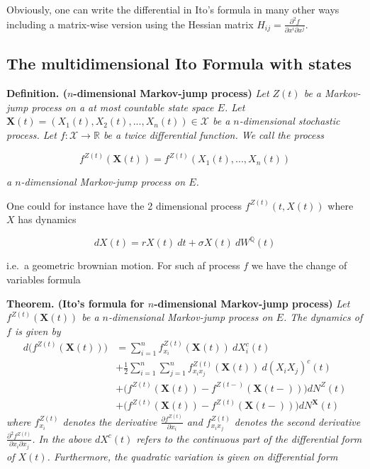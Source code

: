 \documentclass[a4paper,12pt,openany]{book}
\begin{document}
Obviously, one can write the differential in Ito's formula in many other ways including a matrix-wise version using the Hessian matrix \(H_{ij}=\frac{\partial^2 f}{\partial x^i\partial x^j}\).

\hypertarget{the-multidimensional-ito-formula-with-states}{%
\subsection{The multidimensional Ito Formula with states}\label{the-multidimensional-ito-formula-with-states}}

\textbf{Definition. (\(n\)-dimensional Markov-jump process)} \emph{Let \(Z(t)\) be a Markov-jump process on a at most countable state space \(E\). Let \(\mathbf X(t)=(X_1(t),X_2(t),...,X_n(t))\in\mathcal X\) be a \(n\)-dimensional stochastic process. Let \(f : \mathcal X\to \mathbb R\) be a twice differential function. We call the process}

\[
f^{Z(t)}(\mathbf X(t))=f^{Z(t)}(X_1(t),...,X_n(t))
\]

\emph{a \(n\)-dimensional Markov-jump process on \(E\).}

One could for instance have the 2 dimensional process \(f^{Z(t)}(t,X(t))\) where \(X\) has dynamics

\[
dX(t)=rX(t)\ dt + \sigma X(t)\ dW^\mathbb Q(t)
\]

i.e.~a geometric brownian motion. For such af process \(f\) we have the change of variables formula

\textbf{Theorem. (Ito's formula for \(n\)-dimensional Markov-jump process)} \emph{Let \(f^{Z(t)}(\mathbf X(t))\) be a \(n\)-dimensional Markov-jump process on \(E\). The dynamics of \(f\) is given by}
\begin{align*}
d \Big(f^{Z(t)}(\mathbf X(t))\Big)&=\sum_{i=1}^n f_{x_i}^{Z(t)}(\mathbf X(t))\ dX_i^c(t)\\
&+\frac{1}{2}\sum_{i=1}^n\sum_{j=1}^n f_{x_ix_j}^{Z(t)}(\mathbf X(t))\ d(X_iX_j)^c(t)\\
&+\Big(f^{Z(t)}(\mathbf X(t))-f^{Z(t-)}(\mathbf X(t-))\Big)dN^Z(t)\\
&+\Big(f^{Z(t)}(\mathbf X(t))-f^{Z(t)}(\mathbf X(t-))\Big)dN^\mathbf X(t)
\end{align*}
\emph{where \(f^{Z(t)}_{x_i}\) denotes the derivative \(\frac{\partial f^{Z(t)}}{\partial x_i}\) and \(f^{Z(t)}_{x_ix_j}\) denotes the second derivative \(\frac{\partial^2 f^{Z(t)}}{\partial x_i\partial x_j}\). In the above \(dX^c(t)\) refers to the continuous part of the differential form of \(X(t)\). Furthermore, the quadratic variation is given on differential form}
\end{document}
